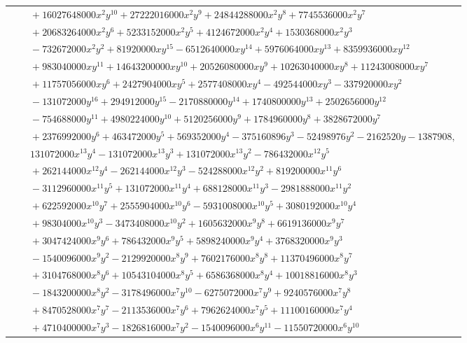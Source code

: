 \documentclass[11pt]{article}
\begin{document}
\begin{longtable}{@{}ll@{}}
 & $\quad +16027648000x^{2}y^{10}+27222016000x^{2}y^{9}+24844288000x^{2}y^{8}+7745536000x^{2}y^{7}$\\
 & $\quad +20683264000x^{2}y^{6}+5233152000x^{2}y^{5}+4124672000x^{2}y^{4}+1530368000x^{2}y^{3}$\\
 & $\quad -732672000x^{2}y^{2}+81920000xy^{15}-6512640000xy^{14}+5976064000xy^{13}+8359936000xy^{12}$\\
 & $\quad +983040000xy^{11}+14643200000xy^{10}+20526080000xy^{9}+10263040000xy^{8}+11243008000xy^{7}$\\
 & $\quad +11757056000xy^{6}+2427904000xy^{5}+2577408000xy^{4}-492544000xy^{3}-337920000xy^{2}$\\
 & $\quad -131072000y^{16}+294912000y^{15}-2170880000y^{14}+1740800000y^{13}+2502656000y^{12}$\\
 & $\quad -754688000y^{11}+4980224000y^{10}+5120256000y^{9}+1784960000y^{8}+3828672000y^{7}$\\
 & $\quad +2376992000y^{6}+463472000y^{5}+569352000y^{4}-375160896y^{3}-52498976y^{2}-2162520y-1387908,$\\
 & $\quad 131072000x^{13}y^{4}-131072000x^{13}y^{3}+131072000x^{13}y^{2}-786432000x^{12}y^{5}$\\
 & $\quad +262144000x^{12}y^{4}-262144000x^{12}y^{3}-524288000x^{12}y^{2}+819200000x^{11}y^{6}$\\
 & $\quad -3112960000x^{11}y^{5}+131072000x^{11}y^{4}+688128000x^{11}y^{3}-2981888000x^{11}y^{2}$\\
 & $\quad +622592000x^{10}y^{7}+2555904000x^{10}y^{6}-5931008000x^{10}y^{5}+3080192000x^{10}y^{4}$\\
 & $\quad +98304000x^{10}y^{3}-3473408000x^{10}y^{2}+1605632000x^{9}y^{8}+6619136000x^{9}y^{7}$\\
 & $\quad +3047424000x^{9}y^{6}+786432000x^{9}y^{5}+5898240000x^{9}y^{4}+3768320000x^{9}y^{3}$\\
 & $\quad -1540096000x^{9}y^{2}-2129920000x^{8}y^{9}+7602176000x^{8}y^{8}+11370496000x^{8}y^{7}$\\
 & $\quad +3104768000x^{8}y^{6}+10543104000x^{8}y^{5}+6586368000x^{8}y^{4}+10018816000x^{8}y^{3}$\\
 & $\quad -1843200000x^{8}y^{2}-3178496000x^{7}y^{10}-6275072000x^{7}y^{9}+9240576000x^{7}y^{8}$\\
 & $\quad +8470528000x^{7}y^{7}-2113536000x^{7}y^{6}+7962624000x^{7}y^{5}+11100160000x^{7}y^{4}$\\
 & $\quad +4710400000x^{7}y^{3}-1826816000x^{7}y^{2}-1540096000x^{6}y^{11}-11550720000x^{6}y^{10}$\\

\end{longtable}
\end{document}
